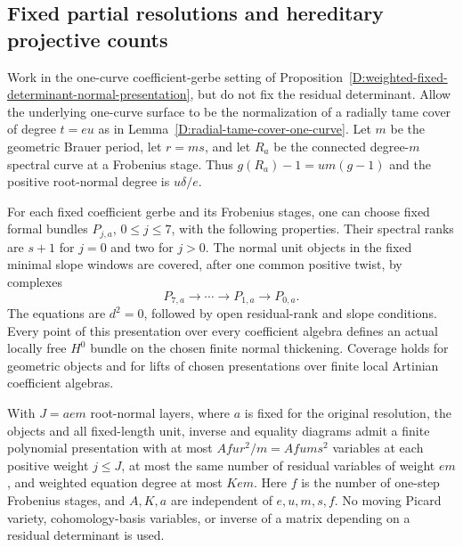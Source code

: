 \subsection{Fixed partial resolutions and hereditary projective counts}

\begin{lemma}
\label{D:fixed-partial-resolution-unit-atlas}
Work in the one-curve coefficient-gerbe setting of
Proposition~\ref{D:weighted-fixed-determinant-normal-presentation},
but do not fix the residual determinant. Allow the underlying
one-curve surface to be the normalization of a radially tame
cover of degree $t=eu$ as in
Lemma~\ref{D:radial-tame-cover-one-curve}. Let $m$ be the
geometric Brauer period, let $r=ms$, and let $R_a$ be the
connected degree-$m$ spectral curve at a Frobenius stage.
Thus $g(R_a)-1=um(g-1)$ and the positive root-normal degree
is $u\delta/e$.

For each fixed coefficient gerbe and its Frobenius stages,
one can choose fixed formal bundles $P_{j,a}$, $0\leq j\leq7$,
with the following properties. Their spectral ranks are
$s+1$ for $j=0$ and two for $j>0$. The normal unit objects
in the fixed minimal slope windows are covered, after one
common positive twist, by complexes
\[
 P_{7,a}\longrightarrow\cdots\longrightarrow
 P_{1,a}\longrightarrow P_{0,a}.                       \tag{D.FR.1}
\]
The equations are $d^2=0$, followed by open residual-rank
and slope conditions. Every point of this presentation over
every coefficient algebra defines an actual locally free
$H^0$ bundle on the chosen finite normal thickening.
Coverage holds for geometric objects and for lifts of
chosen presentations over finite local Artinian coefficient
algebras.

With $J=ae m$ root-normal layers, where $a$ is fixed for
the original resolution, the objects and all fixed-length
unit, inverse and equality diagrams admit a finite
polynomial presentation with at most $Afur^2/m=Afu m s^2$
variables at each positive weight $j\leq J$, at most the
same number of residual variables of weight $em$, and
weighted equation degree at most $Ke m$. Here $f$ is the
number of one-step Frobenius stages, and $A,K,a$ are
independent of $e,u,m,s,f$. No moving Picard variety,
cohomology-basis variables, or inverse of a matrix depending
on a residual determinant is used.
\end{lemma}

